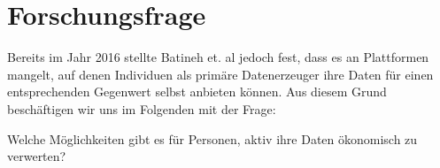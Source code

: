 \section{Forschungsfrage}

Bereits im Jahr 2016 stellte Batineh et. al jedoch fest, dass es an Plattformen mangelt, auf denen Individuen als primäre Datenerzeuger ihre Daten für einen entsprechenden Gegenwert selbst anbieten können. \cite{monetizingData_2016} Aus diesem Grund beschäftigen wir uns im Folgenden mit der Frage:

\begin{center} 
Welche Möglichkeiten gibt es für Personen, aktiv ihre Daten ökonomisch zu verwerten? 
\end{center}

